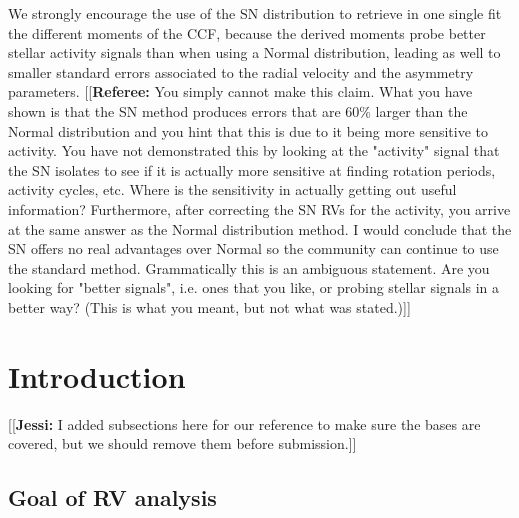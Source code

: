 \documentclass[11pt, oneside]{article}
\newcommand{\jessi}[1]{{\color{Purple}[[\textbf{Jessi: }#1]]}}
\newcommand{\comment}[1]{{\color{red}[[\textbf{Referee: }#1]]}}
\begin{document}
We strongly encourage the use of the SN distribution to retrieve in one single fit the different moments of the CCF, because the derived moments probe better stellar activity signals than when using a Normal distribution, leading as well to smaller standard errors associated to the radial velocity and the asymmetry parameters.
\comment{You simply cannot make this claim. What you have shown is that the SN method produces errors that are 60\% larger than the Normal distribution and you hint that this is due to it being more sensitive to activity. You have not demonstrated this by looking at the "activity" signal that the SN isolates to see if it is actually more sensitive at finding rotation periods, activity cycles, etc. Where is the sensitivity in actually getting out useful information? Furthermore, after correcting the SN RVs for the activity, you arrive at the same answer as the Normal distribution method. I would conclude that the SN offers no real advantages over Normal so the community can continue to use the standard method.
Grammatically this is an ambiguous statement. Are you looking for "better signals", i.e. ones that you like, or probing stellar signals in a better way? (This is what you meant, but not what was stated.)}


\section{Introduction}
\label{intro}
\jessi{I added subsections here for our reference to make sure the bases are covered, but we should remove them before submission.}


\subsection{Goal of RV analysis}
\end{document}
